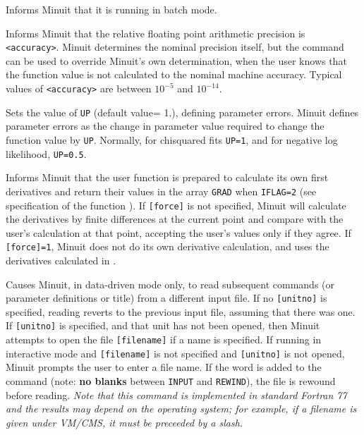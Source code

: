 Informs Minuit that it is running in batch mode.


Informs Minuit that the relative floating point arithmetic
precision is \texttt{<accuracy>}.
Minuit determines the nominal precision itself, but the  command
can be used to override Minuit's own determination, when the user
knows that the  function value is not calculated to the nominal
machine accuracy. Typical values of \texttt{<accuracy>} are between
$10^{-5}$ and $10^{-14}$.


Sets the value of \texttt{UP} (default value= 1.), defining parameter errors.
Minuit defines parameter errors as the change in parameter value
required to change the function value by \texttt{UP}.  
Normally, for chisquared
fits \texttt{UP=1}, and for negative log likelihood, \texttt{UP=0.5}.


Informs Minuit that the user function is prepared to calculate
its own first derivatives and return their values in the array
\texttt{GRAD} when \texttt{IFLAG=2} 
(see specification of the function ).
If \texttt{[force]} is not specified, Minuit will calculate the 
derivatives by finite differences at the current point and
compare with the user's calculation at that point,
accepting the user's values only if they agree.
If \texttt{[force]=1}, Minuit does not do its own derivative calculation,
and uses the derivatives calculated in .


Causes Minuit, in data-driven mode only, to read subsequent
commands (or parameter definitions or title) from a different input file.
If no \texttt{[unitno]} is specified, reading reverts to the previous input
file, assuming that there was one.  If \texttt{[unitno]} is specified, and that
unit has not been opened, then Minuit attempts to open the file
\texttt{[filename]} if a name is specified. If running in interactive mode and
\texttt{[filename]} is not specified and \texttt{[unitno]} is not opened,
Minuit prompts the user to enter a file name.
If the word  is added to the command (note:
{\bf no blanks} between \texttt{INPUT} and \texttt{REWIND}),
the file is rewound before reading.
{\em Note that this command is implemented in standard Fortran 77
and the results may depend on the operating system; for example,
if a filename is given under VM/CMS, it must be preceeded by a slash.}

